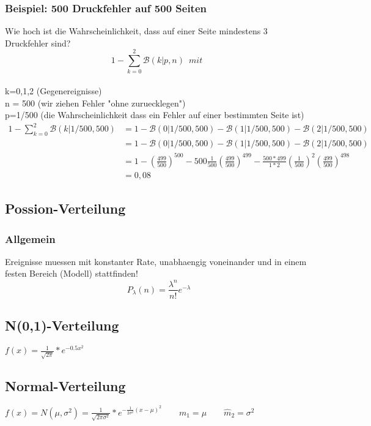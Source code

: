 \documentclass{article}
\begin{document}
\subsubsection{Beispiel: 500 Druckfehler auf 500 Seiten}
Wie hoch ist die Wahrscheinlichkeit, dass auf einer Seite mindestens 3 Druckfehler
sind?
\[
1- \sum_{k=0}^{2} \mathcal{B}(k|p,n) \enspace mit \enspace \] \\
k=0,1,2 (Gegenereignisse)\\ n = 500 
(wir ziehen Fehler "ohne zuruecklegen") \\ p=1/500 (die Wahrscheinlichkeit dass 
ein Fehler auf einer bestimmten Seite ist)\\
\begin{equation*}
	\begin{split}
		1- \sum_{k=0}^{2} \mathcal{B}(k|1/500,500)& = 1 - \mathcal{B}(0|1/500,500) - \mathcal{B}(1|1/500,500) - \mathcal{B}(2|
		1/500,500) \\
		& = 1 -  \mathcal{B}(0|1/500,500) - \mathcal{B}(1|1/500,500) - \mathcal{B}(2|
		1/500,500) \\
		& = 1 - \left( \frac{499}{500} \right) ^{500} - 500\frac{1}{500}\left(\frac{499}{500}\right)^{499} - \frac{500*499}{1*2}\left( \frac{1}{500} \right) ^2 \left( \frac{499}{500} \right) ^{498} \\ & = 0,08
	\end{split}
\end{equation*}
\subsection{Possion-Verteilung}
\subsubsection{Allgemein}
Ereignisse muessen mit konstanter Rate, unabhaengig voneinander und in einem festen 
Bereich (Modell) stattfinden!
\[
	P_{\lambda}(n) = \frac{\lambda ^n}{n!} e ^{- \lambda}
\]
\subsection{N(0,1)-Verteilung}
$f(x) = \frac{1}{\sqrt{2\pi}}*e^{-0.5x^2}$
\subsection{Normal-Verteilung}
$f(x) = N(\mu, \sigma^2) = \frac{1}{\sqrt{2\pi\sigma^2}}*e^{-\frac{1}{2\sigma^2}(x-		
\mu)^2} \quad \quad m_1 = \mu \quad \quad \widehat{m}_2=\sigma^2$
\end{document}

